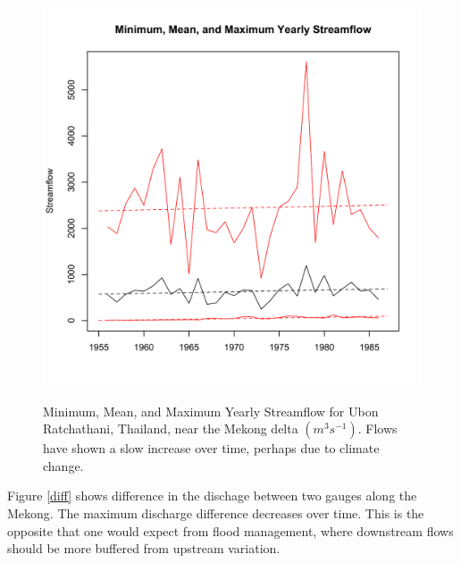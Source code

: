 \documentclass[11pt,english]{article}
\theoremstyle{plain} \newtheorem{claim}{Claim}
\theoremstyle{plain} \newtheorem{prop}{Proposition}
\theoremstyle{plain} \newtheorem{hypo}{Hypothesis}
\begin{document}
\begin{figure}
\includegraphics{displays/bottom-year.pdf}
\label{bottom}
\caption{Minimum, Mean, and Maximum Yearly Streamflow for Ubon Ratchathani, Thailand, near the Mekong delta $(m^3 s^{-1})$.  Flows have shown a slow increase over time, perhaps due to climate change.}
\end{figure}

Figure \ref{diff} shows difference in the dischage between two gauges along the Mekong.  %
The maximum discharge difference decreases over time.  This is the opposite that one would expect from flood management, where downstream flows should be more buffered from upstream variation.
\end{document}
